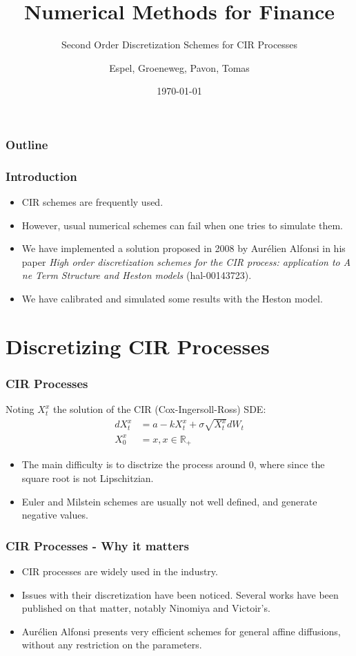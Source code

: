 \documentclass[12pt]{beamer}
\title{Numerical Methods for Finance}
\subtitle{Second Order Discretization Schemes for CIR Processes}
\author{Espel, Groeneweg, Pavon, Tomas}
\institute{Imperial College London}
\date{\today}
\begin{document}
\begin{frame}
    \titlepage
\end{frame}


\begin{frame}
\frametitle{Outline}
\tableofcontents
\end{frame}

\begin{frame}
\frametitle{Introduction}
\begin{itemize}
  \item CIR schemes are frequently used.
  \item However, usual numerical schemes can fail when one tries to simulate them.
  \item We have implemented a solution proposed in 2008 by Aurélien Alfonsi in his paper \textit{High order discretization schemes for the CIR process: application to A ne Term Structure and Heston models} (hal-00143723).
  \item We have calibrated and simulated some results with the Heston model.
\end{itemize}
\end{frame}


\section{Discretizing CIR Processes}
\frame{\tableofcontents[currentsection]}

\begin{frame}
\frametitle{CIR Processes}
Noting $X^{x}_{t}$ the solution of the CIR (Cox-Ingersoll-Ross) SDE:
\begin{align*}
dX^{x}_{t} & = a - kX^{x}_{t} + \sigma \sqrt{X^{x}_{t}} dW_{t} \\
X^{x}_{0} & = x, x \in \mathbb{R_{+}}
\end{align*}
\begin{itemize}
  \item The main difficulty is to disctrize the process around 0, where since the square root is not Lipschitzian.
  \item Euler and Milstein schemes are usually not well defined, and generate negative values.
\end{itemize}
\end{frame}

\begin{frame}
\frametitle{CIR Processes - Why it matters}
\begin{itemize}
  \item CIR processes are widely used in the industry.
  \item Issues with their discretization have been noticed. Several works have been published on that matter, notably Ninomiya and Victoir's.
  \item Aurélien Alfonsi presents very efficient schemes for general affine diffusions, without any restriction on the parameters.
\end{itemize}
\end{frame}
\end{document}
